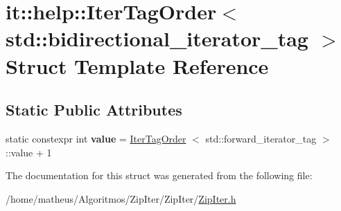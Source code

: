 \hypertarget{structit_1_1help_1_1IterTagOrder_3_01std_1_1bidirectional__iterator__tag_01_4}{}\section{it\+:\+:help\+:\+:Iter\+Tag\+Order$<$ std\+:\+:bidirectional\+\_\+iterator\+\_\+tag $>$ Struct Template Reference}
\label{structit_1_1help_1_1IterTagOrder_3_01std_1_1bidirectional__iterator__tag_01_4}
\subsection*{Static Public Attributes}
\begin{DoxyCompactItemize}
\item 
static constexpr int {\bfseries value} = \hyperlink{structit_1_1help_1_1IterTagOrder}{Iter\+Tag\+Order} $<$ std\+::forward\+\_\+iterator\+\_\+tag $>$\+::value + 1\hypertarget{structit_1_1help_1_1IterTagOrder_3_01std_1_1bidirectional__iterator__tag_01_4_abb018cd9c6f6ac36d79e0224d37db328}{}\label{structit_1_1help_1_1IterTagOrder_3_01std_1_1bidirectional__iterator__tag_01_4_abb018cd9c6f6ac36d79e0224d37db328}

\end{DoxyCompactItemize}


The documentation for this struct was generated from the following file\+:\begin{DoxyCompactItemize}
\item 
/home/matheus/\+Algoritmos/\+Zip\+Iter/\+Zip\+Iter/\hyperlink{ZipIter_8h}{Zip\+Iter.\+h}\end{DoxyCompactItemize}
